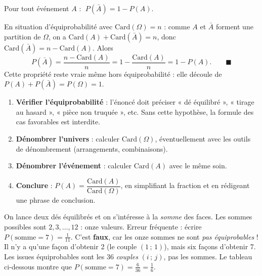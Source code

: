 \documentclass[11pt]{article}
\begin{document}
\begin{propriete}
Pour tout événement $A$ : $\; P(\bar{A}) = 1 - P(A)$.
\end{propriete}

\begin{experience}
En situation d'équiprobabilité avec $\mathrm{Card}(\Omega) = n$ : comme $A$ et $\bar{A}$ forment une partition de $\Omega$, on a $\mathrm{Card}(A) + \mathrm{Card}(\bar{A}) = n$, donc $\mathrm{Card}(\bar{A}) = n - \mathrm{Card}(A)$. Alors
\[ P(\bar{A}) = \frac{n - \mathrm{Card}(A)}{n} = 1 - \frac{\mathrm{Card}(A)}{n} = 1 - P(A). \qquad \blacksquare \]
Cette propriété reste vraie même hors équiprobabilité : elle découle de $P(A) + P(\bar{A}) = P(\Omega) = 1$.
\end{experience}

\begin{methode}
\begin{enumerate}
\item \textbf{Vérifier l'équiprobabilité} : l'énoncé doit préciser « dé équilibré », « tirage au hasard », « pièce non truquée », etc. Sans cette hypothèse, la formule des cas favorables est interdite.
\item \textbf{Dénombrer l'univers} : calculer $\mathrm{Card}(\Omega)$, éventuellement avec les outils de dénombrement (arrangements, combinaisons).
\item \textbf{Dénombrer l'événement} : calculer $\mathrm{Card}(A)$ avec le même soin.
\item \textbf{Conclure} : $P(A) = \dfrac{\mathrm{Card}(A)}{\mathrm{Card}(\Omega)}$, en simplifiant la fraction et en rédigeant une phrase de conclusion.
\end{enumerate}
\end{methode}

\begin{attention}
On lance deux dés équilibrés et on s'intéresse à la \emph{somme} des faces. Les sommes possibles sont $2, 3, \dots, 12$ : onze valeurs. Erreur fréquente : écrire $P(\text{somme} = 7) = \frac{1}{11}$. C'est \textbf{faux}, car les onze sommes ne sont \emph{pas équiprobables} ! Il n'y a qu'une façon d'obtenir 2 (le couple $(1\,;\,1)$), mais six façons d'obtenir 7. Les issues équiprobables sont les 36 \emph{couples} $(i\,;\,j)$, pas les sommes. Le tableau ci-dessous montre que $P(\text{somme} = 7) = \frac{6}{36} = \frac{1}{6}$.
\end{attention}
\end{document}
